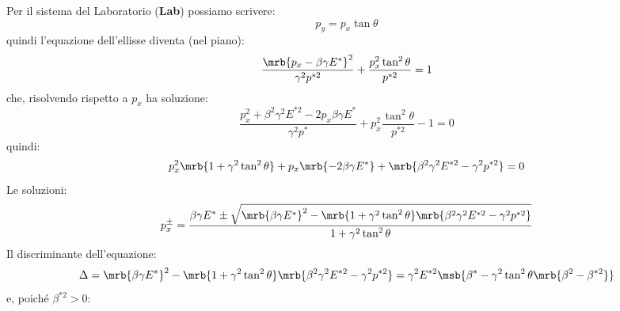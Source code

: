 Per il sistema del Laboratorio (\textbf{Lab}) possiamo scrivere:
\begin{equation}
	p_y = p_x \tan \theta
\end{equation}
quindi l'equazione dell'ellisse diventa (nel piano):
\begin{equation}
	\frac{\mrb{p_x - \beta \gamma E^\ast}^2}{\gamma^2 p^{\ast2}}
  + \frac{p_x^2 \tan^2 \theta}{p^{\ast2}}
  = 1
\end{equation}
che, risolvendo rispetto a $p_x$ ha soluzione:
\begin{equation}
	\frac{p_x^2 + \beta^2 \gamma^2 E^{\ast2} - 2 p_x \beta \gamma E^\ast}{\gamma^2 p^\ast}
  + p_x^2 \frac{\tan^2 \theta}{p^{\ast2}}
  - 1
  = 0
\end{equation}
quindi:
\begin{equation}
	p_x^2 \mrb{1 + \gamma^2 \tan^2 \theta}
  + p_x \mrb{-2 \beta \gamma E^\ast}
  + \mrb{\beta^2 \gamma^2 E^{\ast2}
  - \gamma^2 p^{\ast2}}
  = 0
\end{equation}
Le soluzioni:
\begin{equation}
	p_x^\pm = \frac{\beta \gamma E^\ast \pm \sqrt{\mrb{\beta \gamma
				E^\ast}^2 - \mrb{1 + \gamma^2 \tan^2 \theta} \mrb{\beta^2 \gamma^2 E^{\ast2} -
				\gamma^2 p^{\ast2}}}}{1 + \gamma^2 \tan^2 \theta}
\end{equation}
Il discriminante dell'equazione:
\begin{equation}
	\Delta = \mrb{\beta \gamma E^\ast}^2 - \mrb{1 + \gamma^2 \tan^2 \theta}
	\mrb{\beta^2 \gamma^2 E^{\ast2} - 			\gamma^2 p^{\ast2}} = \gamma^2 E^{\ast2}
	\msb{\beta^\ast - \gamma^2 \tan^2 \theta \mrb{\beta^2 - \beta^{\ast2}}}
\end{equation}
e, poiché $\beta^{\ast2} > 0$:

